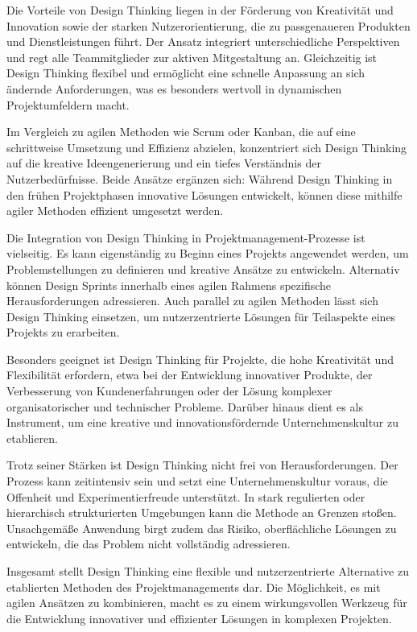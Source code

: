 \documentclass[ngerman]{seminarvorlage}
\begin{document}
Die Vorteile von Design Thinking liegen in der Förderung von Kreativität und Innovation sowie der starken Nutzerorientierung, die zu passgenaueren Produkten und Dienstleistungen führt. Der Ansatz integriert unterschiedliche Perspektiven und regt alle Teammitglieder zur aktiven Mitgestaltung an. Gleichzeitig ist Design Thinking flexibel und ermöglicht eine schnelle Anpassung an sich ändernde Anforderungen, was es besonders wertvoll in dynamischen Projektumfeldern macht.  

Im Vergleich zu agilen Methoden wie Scrum oder Kanban, die auf eine schrittweise Umsetzung und Effizienz abzielen, konzentriert sich Design Thinking auf die kreative Ideengenerierung und ein tiefes Verständnis der Nutzerbedürfnisse. Beide Ansätze ergänzen sich: Während Design Thinking in den frühen Projektphasen innovative Lösungen entwickelt, können diese mithilfe agiler Methoden effizient umgesetzt werden.  

Die Integration von Design Thinking in Projektmanagement-Prozesse ist vielseitig. Es kann eigenständig zu Beginn eines Projekts angewendet werden, um Problemstellungen zu definieren und kreative Ansätze zu entwickeln. Alternativ können Design Sprints innerhalb eines agilen Rahmens spezifische Herausforderungen adressieren. Auch parallel zu agilen Methoden lässt sich Design Thinking einsetzen, um nutzerzentrierte Lösungen für Teilaspekte eines Projekts zu erarbeiten.  

Besonders geeignet ist Design Thinking für Projekte, die hohe Kreativität und Flexibilität erfordern, etwa bei der Entwicklung innovativer Produkte, der Verbesserung von Kundenerfahrungen oder der Lösung komplexer organisatorischer und technischer Probleme. Darüber hinaus dient es als Instrument, um eine kreative und innovationsfördernde Unternehmenskultur zu etablieren.  

Trotz seiner Stärken ist Design Thinking nicht frei von Herausforderungen. Der Prozess kann zeitintensiv sein und setzt eine Unternehmenskultur voraus, die Offenheit und Experimentierfreude unterstützt. In stark regulierten oder hierarchisch strukturierten Umgebungen kann die Methode an Grenzen stoßen. Unsachgemäße Anwendung birgt zudem das Risiko, oberflächliche Lösungen zu entwickeln, die das Problem nicht vollständig adressieren.  

Insgesamt stellt Design Thinking eine flexible und nutzerzentrierte Alternative zu etablierten Methoden des Projektmanagements dar. Die Möglichkeit, es mit agilen Ansätzen zu kombinieren, macht es zu einem wirkungsvollen Werkzeug für die Entwicklung innovativer und effizienter Lösungen in komplexen Projekten.
\cite{simschek_agilitat_2023, sp_mit_2022}
\end{document}
